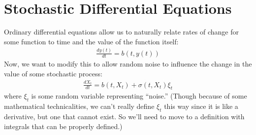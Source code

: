 \documentclass[12pt]{article}
\theoremstyle{plain}
\theoremstyle{definition}
\theoremstyle{remark}
\begin{document}
\section{Stochastic Differential Equations}

Ordinary differential equations allow us to naturally relate rates of
change for some function to time and the value of the function itself:
\begin{align*}
  \frac{dy(t)}{dt} = b(t,y(t))
\end{align*}
Now, we want to modify this to allow random noise to influence the
change in the value of some stochastic process:
\begin{align*}
  \frac{dX_t}{dt} = b(t,X_t) + \sigma(t,X_t) \xi_t
\end{align*}
where $\xi_t$ is some random variable representing ``noise.'' (Though
because of some mathematical technicalities, we can't really define
$\xi_t$ this way since it is like a derivative, but one that cannot
exist. So we'll need to move to a definition with integrals that can be
properly defined.)




\clearpage
\end{document}
